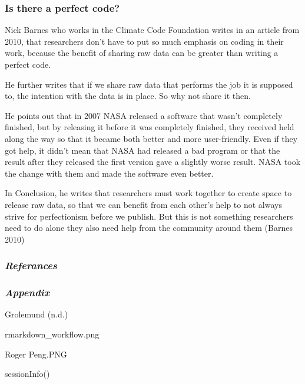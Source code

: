 \documentclass[
]{article}
\newenvironment{Shaded}{\begin{snugshade}}{\end{snugshade}}
\newcommand{\FunctionTok}[1]{\textcolor[rgb]{0.00,0.00,0.00}{#1}}
\newcommand{\NormalTok}[1]{#1}
\begin{document}
\hypertarget{is-there-a-perfect-code}{%
\subsubsection{Is there a perfect code?}\label{is-there-a-perfect-code}}

Nick Barnes who works in the Climate Code Foundation writes in an
article from 2010, that researchers don't have to put so much emphasis
on coding in their work, because the benefit of sharing raw data can be
greater than writing a perfect code.

He further writes that if we share raw data that performs the job it is
supposed to, the intention with the data is in place. So why not share
it then.

He points out that in 2007 NASA released a software that wasn't
completely finished, but by releasing it before it was completely
finished, they received held along the way so that it became both better
and more user-friendly. Even if they got help, it didn't mean that NASA
had released a bad program or that the result after they released the
first version gave a slightly worse result. NASA took the change with
them and made the software even better.

In Conclusion, he writes that researchers must work together to create
space to release raw data, so that we can benefit from each other's help
to not always strive for perfectionism before we publish. But this is
not something researchers need to do alone they also need help from the
community around them (Barnes 2010)

\hypertarget{referances}{%
\subsubsection{\texorpdfstring{\emph{Referances}}{Referances}}\label{referances}}

\hypertarget{appendix}{%
\subsubsection{\texorpdfstring{\emph{Appendix}}{Appendix}}\label{appendix}}

Grolemund (n.d.)

rmarkdown\_workflow.png

Roger Peng.PNG

\begin{Shaded}
\begin{Highlighting}[]
\FunctionTok{sessionInfo}\NormalTok{()}
\end{Highlighting}
\end{Shaded}
\end{document}
